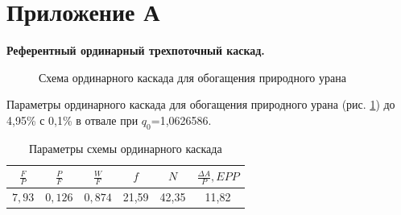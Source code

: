 \chapter*{Приложение А}             %
\noindent

\renewcommand{\thefigure}{A\arabic{figure}}
\setcounter{figure}{0}
\renewcommand{\thetable}{A\arabic{table}}
\setcounter{table}{0}

\textbf{Референтный ординарный трехпоточный каскад.}

\begin{figure}[ht]
  \caption{Схема ординарного каскада для обогащения природного урана}\label{uranfN}
\end{figure}

Параметры ординарного каскада для обогащения природного урана (рис. \ref{uranfN}) до 4,95\% с 0,1\% в отвале при $q_0$=1,0626586.

\begin{table}[ht]
    \centering
    \caption{Параметры схемы ординарного каскада}\label{ordninary495}
    \normalsize\begin{tabulary}{1.0\textwidth}{|c|c|c|c|c|c|}
        \hline $\frac{F}{P}$ & $\frac{P}{F}$ & $\frac{W}{F}$ & $f$ & $N$ & $\frac{\Delta A}{P}, EPP$\\
        \hline $7,93$ & $0,126$ & $0,874$ & 21,59 & 42,35 & 11,82\\\hline
    \end{tabulary}
\end{table}

